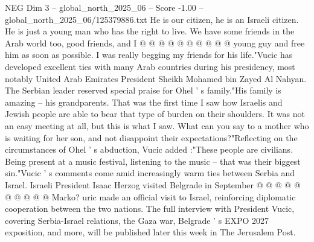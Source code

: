 \begin{textsample}{NEG Dim 3 – global\_north\_2025\_06 – Score -1.00 – global\_north\_2025\_06/125379886.txt}
He is our citizen, he is an Israeli citizen.
He is just a young man who has the right to live.
We have some friends in the Arab world too, good friends, and I @ @ @ @ @ @ @ @ @ @ young guy and free him as soon as possible.
I was really begging my friends for his life."Vucic has developed excellent ties with many Arab countries during his presidency, most notably United Arab Emirates President Sheikh Mohamed bin Zayed Al Nahyan.
The Serbian leader reserved special praise for Ohel ' s family."His family is amazing -- his grandparents.
That was the first time I saw how Israelis and Jewish people are able to bear that type of burden on their shoulders.
It was not an easy meeting at all, but this is what I saw.
What can you say to a mother who is waiting for her son, and not disappoint their expectations?"Reflecting on the circumstances of Ohel ' s abduction, Vucic added :"These people are civilians.
Being present at a music festival, listening to the music -- that was their biggest sin."Vucic ' s comments come amid increasingly warm ties between Serbia and Israel.
Israeli President Isaac Herzog visited Belgrade in September @ @ @ @ @ @ @ @ @ @ Marko? uric made an official visit to Israel, reinforcing diplomatic cooperation between the two nations.
The full interview with President Vucic, covering Serbia-Israel relations, the Gaza war, Belgrade ' s EXPO 2027 exposition, and more, will be published later this week in The Jerusalem Post.

\end{textsample}
